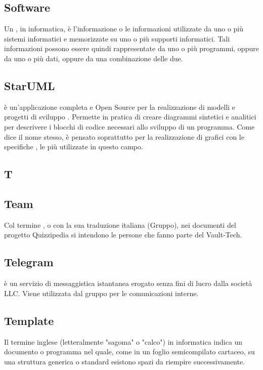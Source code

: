 \subsection*{Software}
Un , in informatica, è l'informazione o le informazioni utilizzate da uno o più
sistemi informatici e memorizzate su uno o più supporti informatici. Tali informazioni possono
essere quindi rappresentate da uno o più programmi, oppure da uno o più dati, oppure
da una combinazione delle due.

\subsection*{StarUML}
 è un'applicazione completa e Open Source per la realizzazione di modelli e progetti di sviluppo . Permette in pratica di creare diagrammi sintetici e analitici per descrivere i blocchi di codice necessari allo sviluppo di un programma. Come dice il nome stesso,  è pensato soprattutto per la realizzazione di grafici con le specifiche , le più utilizzate in questo campo.

\newpage

\begin{center}
\Huge\section*{\uppercase{T}}
\end{center}

\subsection*{Team}
Col termine , o con la sua traduzione italiana (Gruppo), nei documenti del progetto
Quizzipedia si intendono le persone che fanno parte del Vault-Tech.


\subsection*{Telegram}
 è un servizio di messaggistica istantanea erogato senza fini di lucro dalla società  LLC. Viene utilizzata dal gruppo per le comunicazioni interne.

\subsection*{Template}
Il termine inglese  (letteralmente "sagoma" o "calco") in informatica
indica un documento o programma nel quale, come in un foglio semicompilato
cartaceo, su una struttura generica o standard esistono spazi da riempire
successivamente.


